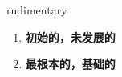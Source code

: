 
\begin{frame}
{\huge rudimentary}
\begin{center}
\begin{enumerate}\Large
  \item \textbf{初始的，未发展的}
  \item \textbf{最根本的，基础的}
\end{enumerate}
\end{center}
\end{frame}
